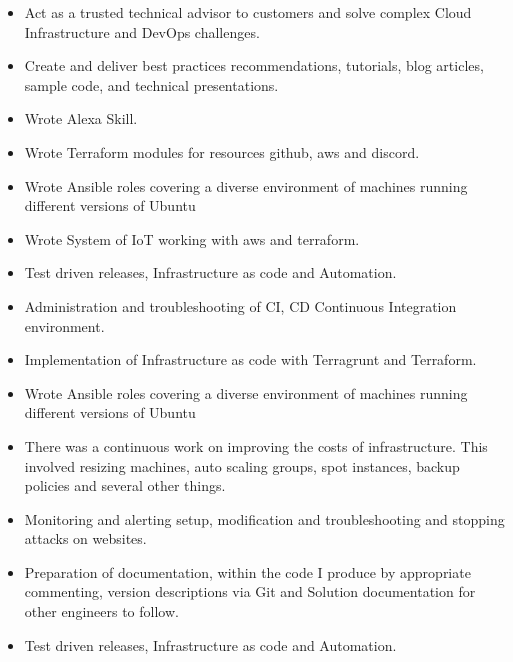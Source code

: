 
\begin{itemize}
    \item Act as a trusted technical advisor to customers and solve complex Cloud Infrastructure and DevOps challenges.
    \item Create and deliver best practices recommendations, tutorials, blog articles, sample code, and technical presentations.
    \item Wrote Alexa Skill.
    \item Wrote Terraform modules for resources github, aws and discord.
    \item Wrote Ansible roles covering a diverse environment of machines running different versions of Ubuntu
    \item Wrote System of IoT working with aws and terraform.
    \item Test driven releases, Infrastructure as code and Automation.
    \item Administration and troubleshooting of CI, CD Continuous Integration environment.
\end{itemize}

\divider

\begin{itemize}
    \item Implementation of Infrastructure as code with Terragrunt and Terraform.
    \item Wrote Ansible roles covering a diverse environment of machines running different versions of Ubuntu
    \item There was a continuous work on improving the costs of infrastructure. This involved resizing machines, auto scaling groups, spot instances, backup policies and several other things.
    \item Monitoring and alerting setup, modification and troubleshooting and stopping attacks on websites.
    \item Preparation of documentation, within the code I produce by appropriate commenting, version descriptions via Git and Solution documentation for other engineers to follow.
    \item Test driven releases, Infrastructure as code and Automation.
\end{itemize}
